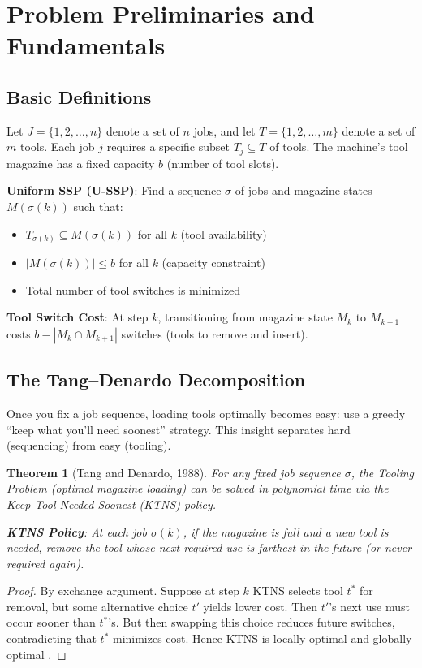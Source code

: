 \documentclass[12pt]{article}
\newtheorem{theorem}{Theorem}[section]
\begin{document}
	\section{Problem Preliminaries and Fundamentals}
	
	\subsection{Basic Definitions}
	
	Let $J = \{1, 2, \ldots, n\}$ denote a set of $n$ jobs, and let $T = \{1, 2, \ldots, m\}$ denote a set of $m$ tools. Each job $j$ requires a specific subset $T_j \subseteq T$ of tools. The machine's tool magazine has a fixed capacity $b$ (number of tool slots).
	
	\textbf{Uniform SSP (U-SSP)}: Find a sequence $\sigma$ of jobs and magazine states $M(\sigma(k))$ such that:
	\begin{itemize}[noitemsep]
		\item $T_{\sigma(k)} \subseteq M(\sigma(k))$ for all $k$ (tool availability)
		\item $|M(\sigma(k))| \le b$ for all $k$ (capacity constraint)
		\item Total number of tool switches is minimized
	\end{itemize}
	
	\textbf{Tool Switch Cost}: At step $k$, transitioning from magazine state $M_k$ to $M_{k+1}$ costs $b - |M_k \cap M_{k+1}|$ switches (tools to remove and insert).
	
	\subsection{The Tang--Denardo Decomposition}
	
	\begin{intuitionbox}
		Once you fix a job sequence, loading tools optimally becomes easy: use a greedy \\``keep what you'll need soonest'' strategy. This insight separates hard (sequencing) from easy (tooling).
	\end{intuitionbox}
	
	\begin{theorem}[Tang and Denardo, 1988]
		\label{thm:tang_denardo}
		For any fixed job sequence $\sigma$, the Tooling Problem (optimal magazine loading) can be solved in polynomial time via the Keep Tool Needed Soonest (KTNS) policy.
		
		\textbf{KTNS Policy}: At each job $\sigma(k)$, if the magazine is full and a new tool is needed, remove the tool whose next required use is farthest in the future (or never required again).
	\end{theorem}
	\begin{proof}
		By exchange argument. Suppose at step $k$ KTNS selects tool $t^*$ for removal, but some alternative choice $t'$ yields lower cost. Then $t'$'s next use must occur sooner than $t^*$'s. But then swapping this choice reduces future switches, contradicting that $t^*$ minimizes cost. Hence KTNS is locally optimal and globally optimal \citep{Tang1988}.
	\end{proof}
	
\end{document}

